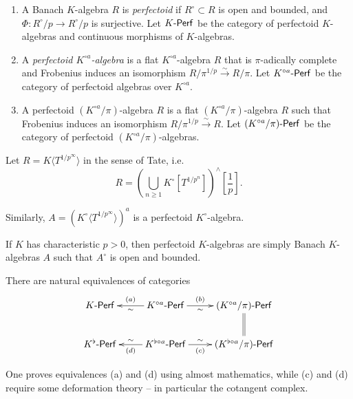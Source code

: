 \documentclass{article}
\begin{document}
\begin{definition}
\begin{enumerate}
  \item A Banach $K$-algebra $R$ is \emph{perfectoid} if $R^\circ\subset R$ is 
    open and bounded, and $\Phi:R^\circ/p \to R^\circ/p$ is surjective. Let 
    $K\textnormal{-}\mathsf{Perf}$ be the category of perfectoid $K$-algebras and continuous 
    morphisms of $K$-algebras. 
  \item A \emph{perfectoid $K^{\circ a}$-algebra} is a flat 
    $K^{\circ a}$-algebra $R$ that is $\pi$-adically complete and Frobenius 
    induces an isomorphism $R/\pi^{1/p} \xrightarrow\sim R/\pi$. Let 
    $K^{\circ a}\textnormal{-}\mathsf{Perf}$ be the category of perfectoid algebras over 
    $K^{\circ a}$. 
  \item A perfectoid $(K^{\circ a}/\pi)$-algebra $R$ is a flat 
    $(K^{\circ a}/\pi)$-algebra $R$ such that Frobenius induces an isomorphism 
    $R/\pi^{1/p} \xrightarrow \sim R$. Let $(K^{\circ a}/\pi)\textnormal{-}\mathsf{Perf}$ be the 
    category of perfectoid $(K^{\circ a}/\pi)$-algebras. 
\end{enumerate}
\end{definition}

\begin{example}
Let $R=K\langle T^{1/p^\infty}\rangle$ in the sense of Tate, i.e. 
\[
  R=\left(\bigcup_{n\geqslant 1} K^\circ[T^{1/p^n}]\right)^\wedge[\frac 1 p] .
\]
\end{example}

\begin{example}
Similarly, $A=(K^\circ\langle T^{1/p^\infty}\rangle)^a$ is a perfectoid 
$K^\circ$-algebra. 
\end{example}

\begin{example}
If $K$ has characteristic $p>0$, then perfectoid $K$-algebras are simply 
Banach $K$-algebras $A$ such that $A^\circ$ is open and bounded. 
\end{example}

\begin{theorem}
There are natural equivalences of categories 
\[\xymatrix{
  K\Perf 
    & \ar[l]^-\sim_-{(a)} K^{\circ a}\Perf \ar[r]_-\sim^-{(b)} 
    & (K^{\circ a}/\pi)\Perf \ar@{=}[d] \\
  K^\flat\Perf 
    & \ar[l]_-\sim^-{(d)} K^{\flat\circ a}\Perf \ar[r]^-\sim_-{(c)} 
    & (K^{\flat\circ a}/\pi)\Perf
}\]
\end{theorem}

One proves equivalences (a) and (d) using almost mathematics, while (c) and (d) 
require some deformation theory -- in particular the cotangent complex. 
\end{document}
